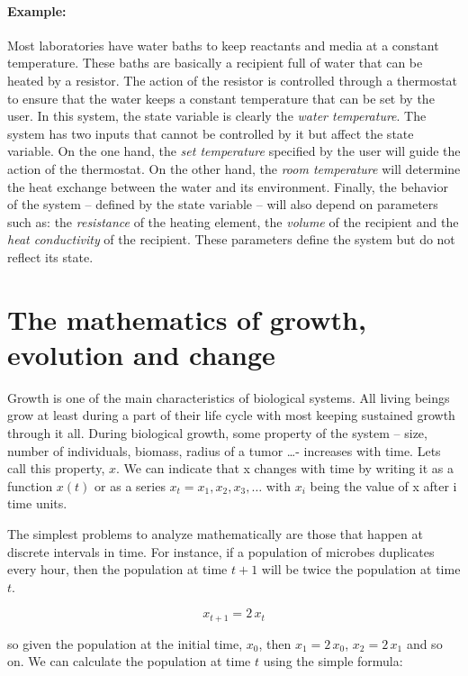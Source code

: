 \documentclass{tufte-book} %
\begin{document}
\paragraph{Example:} Most laboratories have water baths to keep reactants and media at a constant temperature. These baths are basically a recipient full of water that can be heated by a resistor. The action of the resistor is controlled through a thermostat to ensure that the water keeps a constant temperature that can be set by the user. In this system, the state variable is clearly the \emph{water temperature}. The system has two inputs that cannot be controlled by it but affect the state variable. On the one hand, the \emph{set temperature} specified by the user will guide the action of the thermostat. On the other hand, the \emph{room temperature} will determine the heat exchange between the water and its environment. Finally, the behavior of the system -- defined by the state variable -- will also depend on parameters such as: the \emph{resistance} of the heating element, the \emph{volume} of the recipient and the \emph{heat conductivity} of the recipient. These parameters define the system but do not reflect its state.
\section{The mathematics of growth, evolution and change}
Growth is one of the main characteristics of biological systems. All living beings grow at least during a part of their life cycle with most keeping sustained growth through it all. During biological growth, some property of the system -- size, number of individuals, biomass, radius of a tumor \dots - increases with time. Lets call this property, $x$. We can indicate that x changes with time by writing it as a function $x(t)$ or as a series $x_t = x_1, x_2, x_3,\dots$ with $x_i$ being the value of x after i time units.

The simplest problems to analyze mathematically are those that happen at discrete intervals in time. For instance, if a population of microbes duplicates every hour, then the population at time $t+1$ will be twice the population at time $t$.

\begin{equation}
	\label{geomgrowth_example}
	x_{t+1} = 2 \, x_t
\end{equation}

so given the population at the initial time,  $x_0$, then $x_1=2\, x_0$, $x_2=2\, x_1$ and so on. We can calculate the population at time $t$ using the simple formula:
\end{document}
